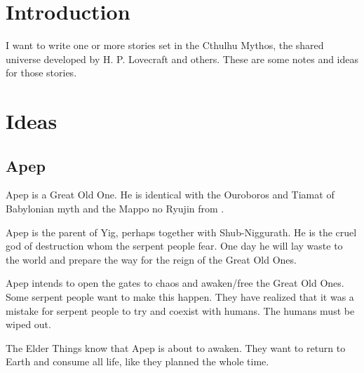 \documentclass[a4paper,12pt,openany,oneside]{book}
\begin{document}
\chapter{Introduction}
I want to write one or more stories set in the Cthulhu Mythos, the shared universe developed by H. P. Lovecraft and others. 
These are some notes and ideas for those stories. 























\chapter{Ideas}















\section{Apep}
Apep is a Great Old One.
He is identical with the Ouroboros and Tiamat of Babylonian myth and the Mappo no Ryujin from \cite{RPG:CallofCthulhu:SecretsofJapan}. 

Apep is the parent of Yig, perhaps together with Shub-Niggurath.
He is the cruel god of destruction whom the serpent people fear.
One day he will lay waste to the world and prepare the way for the reign of the Great Old Ones.

Apep intends to open the gates to chaos and awaken/free the Great Old Ones. 
Some serpent people want to make this happen.
They have realized that it was a mistake for serpent people to try and coexist with humans. 
The humans must be wiped out. 

The Elder Things know that Apep is about to awaken.
They want to return to Earth and consume all life, like they planned the whole time.
\end{document}
